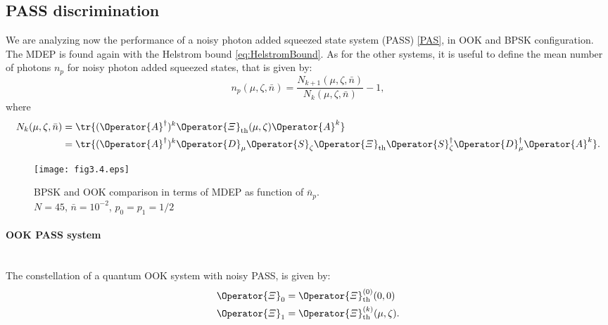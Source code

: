     \subsection{PASS discrimination}
        We are analyzing now the performance of a noisy photon added squeezed state system (PASS)
        \ref{PAS}, in OOK and BPSK configuration. The MDEP is found again with the Helstrom bound
        \ref{eq:HelstromBound}.
        As for the other systems, it is useful to define the mean number of photons $n_p$ for noisy 
        photon added squeezed states, that is given by:
        \begin{equation}
            n_p(\mu,\zeta,\bar{n}) = \frac{N_{k+1}(\mu,\zeta,\bar{n})}{N_k(\mu,\zeta,\bar{n})}-1,
            \label{eq:np_PASS}
        \end{equation}
        where
        \begin{equation}
            \begin{split}
                N_k(\mu,\zeta,\bar{n}) &= \tr{(\Operator{A}^\dagger)^k \Operator{\varXi}_{\mathrm{th}}(\mu,\zeta) \Operator{A}^k}\\
                                       &= \tr{(\Operator{A}^\dagger)^k \Operator{D}_\mu \Operator{S}_\zeta \Operator{\varXi}_{\mathrm{th}}
                                        \Operator{S}_\zeta^\dagger \Operator{D}_\mu^\dagger \Operator{A}^k}.
            \end{split}
        \end{equation}
        
        \begin{figure}[t]
            \texttt{[image: fig3.4.eps]}
            \caption{BPSK and OOK comparison in terms of MDEP as function of $\bar{n}_p$. \\$N=45$, $\bar{n}=10^{-2}$, $p_0=p_1=1/2$}
            \label{fig:3.4}
        \end{figure}

        \paragraph{OOK PASS system}\mbox{}\\
        The constellation of a quantum OOK system with noisy PASS, is given by:
        \begin{subequations}
            \begin{align}
                \Operator{\varXi}_0 &= \Operator{\varXi}_{\mathrm{th}}^{(0)}(0,0)\\
                \Operator{\varXi}_1 &= \Operator{\varXi}_{\mathrm{th}}^{(k)}(\mu,\zeta).
            \end{align}
        \end{subequations}
        
